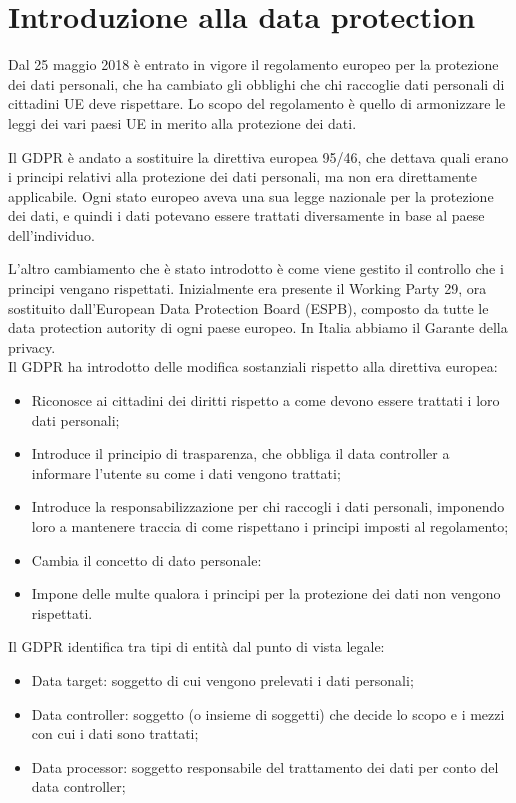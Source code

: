 \chapter{Introduzione alla data protection}

Dal 25 maggio 2018 è entrato in vigore il regolamento europeo per la protezione dei dati personali, che ha cambiato gli obblighi che chi raccoglie dati personali di cittadini UE deve rispettare. Lo scopo del regolamento è quello di armonizzare le leggi dei vari paesi UE in merito alla protezione dei dati. 

Il GDPR è andato a sostituire la direttiva europea 95/46, che dettava quali erano i principi relativi alla protezione dei dati personali, ma non era direttamente applicabile. Ogni stato europeo aveva una sua legge nazionale per la protezione dei dati, e quindi i dati potevano essere trattati diversamente in base al paese dell'individuo. 

L'altro cambiamento che è stato introdotto è come viene gestito il controllo che i principi vengano rispettati. Inizialmente era presente il Working Party 29, ora sostituito dall'European Data Protection Board (ESPB), composto da tutte le data protection autority di ogni paese europeo. In Italia abbiamo il Garante della privacy.
\\

\noindent Il GDPR ha introdotto delle modifica sostanziali rispetto alla direttiva europea:
\begin{itemize}
    \item Riconosce ai cittadini dei diritti rispetto a come devono essere trattati i loro dati personali;
    \item Introduce il principio di trasparenza, che obbliga il data controller a informare l'utente su come i dati vengono trattati;
    \item Introduce la responsabilizzazione per chi raccogli i dati personali, imponendo loro a mantenere traccia di come rispettano i principi imposti al regolamento;
    \item Cambia il concetto di dato personale:
    \item Impone delle multe qualora i principi per la protezione dei dati non vengono rispettati.
\end{itemize}

\noindent Il GDPR identifica tra tipi di entità dal punto di vista legale:
\begin{itemize}
    \item Data target: soggetto di cui vengono prelevati i dati personali;
    \item Data controller: soggetto (o insieme di soggetti) che decide lo scopo e i mezzi con cui i dati sono trattati;
    \item Data processor: soggetto responsabile del trattamento dei dati per conto del data controller;
\end{itemize}
\\

